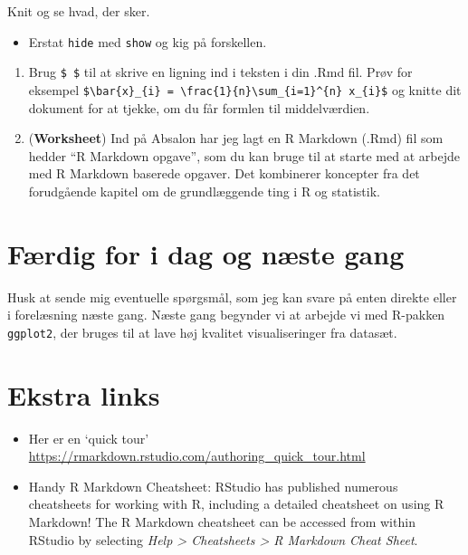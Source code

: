 \documentclass[
]{book}
\providecommand{\tightlist}{%
  \setlength{\itemsep}{0pt}\setlength{\parskip}{0pt}}
\begin{document}
Knit og se hvad, der sker.

\begin{itemize}
\tightlist
\item
  Erstat \texttt{hide} med \texttt{show} og kig på forskellen.
\end{itemize}

\begin{enumerate}
\def\labelenumi{\arabic{enumi})}
\setcounter{enumi}{9}
\item
  Brug \texttt{\$\ \$} til at skrive en ligning ind i teksten i din .Rmd fil. Prøv for eksempel \texttt{\$\textbackslash{}bar\{x\}\_\{i\}\ =\ \textbackslash{}frac\{1\}\{n\}\textbackslash{}sum\_\{i=1\}\^{}\{n\}\ x\_\{i\}\$} og knitte dit dokument for at tjekke, om du får formlen til middelværdien.
\item
  (\textbf{Worksheet}) Ind på Absalon har jeg lagt en R Markdown (.Rmd) fil som hedder ``R Markdown opgave'', som du kan bruge til at starte med at arbejde med R Markdown baserede opgaver. Det kombinerer koncepter fra det forudgående kapitel om de grundlæggende ting i R og statistik.
\end{enumerate}

\hypertarget{fuxe6rdig-for-i-dag-og-nuxe6ste-gang}{%
\section{Færdig for i dag og næste gang}\label{fuxe6rdig-for-i-dag-og-nuxe6ste-gang}}

Husk at sende mig eventuelle spørgsmål, som jeg kan svare på enten direkte eller i forelæsning næste gang. Næste gang begynder vi at arbejde vi med R-pakken \texttt{ggplot2}, der bruges til at lave høj kvalitet visualiseringer fra datasæt.

\hypertarget{ekstra-links}{%
\section{Ekstra links}\label{ekstra-links}}

\begin{itemize}
\item
  Her er en `quick tour' \url{https://rmarkdown.rstudio.com/authoring_quick_tour.html}
\item
  Handy R Markdown Cheatsheet: RStudio has published numerous cheatsheets for working with R, including a detailed cheatsheet on using R Markdown! The R Markdown cheatsheet can be accessed from within RStudio by selecting \emph{Help \textgreater{} Cheatsheets \textgreater{} R Markdown Cheat Sheet}.
\end{itemize}
\end{document}
